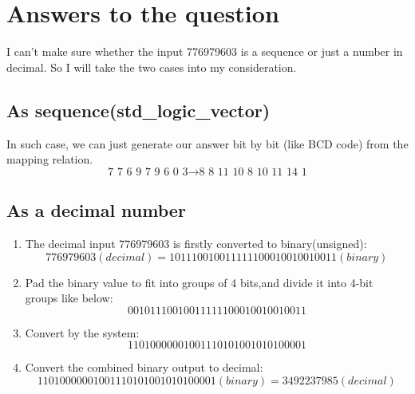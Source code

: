\documentclass[]{article}
\begin{document}
\section{Answers to the question}
\noindent I can't make sure whether the input 776979603 is a sequence or just a number in decimal. So I will take the two cases into my consideration.
\subsection{As sequence(std\_logic\_vector)}
\noindent In such case, we can just generate our answer bit by bit (like BCD code) from the mapping relation.
$$\text{7 7 6 9 7 9 6 0 3} \to \text{8 8 11 10 8 10 11 14 1}$$

\subsection{As a decimal number}
\begin{enumerate}

    \item The decimal input 776979603 is firstly converted to binary(unsigned):\\
          $$776979603 (decimal) = 101110010011111100010010010011 (binary)$$

    \item Pad the binary value to fit into groups of 4 bits,and divide it into 4-bit groups like below:
          $$0010 1110 0100 1111 1100 0100 1001 0011$$

    \item Convert by the system:
          $$ 1101 0000 0010 0111 0101 0010 1010 0001$$

    \item  Convert the combined binary output to decimal:
          $$11010000001001110101001010100001(binary) = 3492237985(decimal)$$

\end{enumerate}
\end{document}
